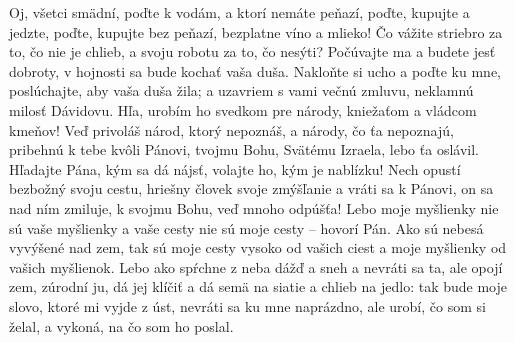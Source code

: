 Oj, všetci smädní, poďte k vodám, a ktorí nemáte peňazí, poďte, kupujte a jedzte, poďte, kupujte bez peňazí, bezplatne víno a mlieko!
Čo vážite striebro za to, čo nie je chlieb, a svoju robotu za to, čo nesýti?
Počúvajte ma a budete jesť dobroty, v hojnosti sa bude kochať vaša duša.
\versseparator
Nakloňte si ucho a poďte ku mne, poslúchajte, aby vaša duša žila; a uzavriem s vami večnú zmluvu, neklamnú milosť Dávidovu.
Hľa, urobím ho svedkom pre národy, kniežaťom a vládcom kmeňov!
Veď privoláš národ, ktorý nepoznáš, a národy, čo ťa nepoznajú, pribehnú k tebe kvôli Pánovi, tvojmu Bohu, Svätému Izraela, lebo ťa oslávil.
\versseparator
Hľadajte Pána, kým sa dá nájsť, volajte ho, kým je nablízku!
Nech opustí bezbožný svoju cestu, hriešny človek svoje zmýšľanie a vráti sa k Pánovi, on sa nad ním zmiluje, k svojmu Bohu, veď mnoho odpúšťa!
Lebo moje myšlienky nie sú vaše myšlienky a vaše cesty nie sú moje cesty – hovorí Pán. Ako sú nebesá vyvýšené nad zem, tak sú moje cesty vysoko od vašich ciest a moje myšlienky od vašich myšlienok.
\versseparator
Lebo ako spŕchne z neba dážď a sneh a nevráti sa ta, ale opojí zem, zúrodní ju, dá jej klíčiť a dá semä na siatie a chlieb na jedlo: tak bude moje slovo, ktoré mi vyjde z úst, nevráti sa ku mne naprázdno, ale urobí, čo som si želal, a vykoná, na čo som ho poslal.